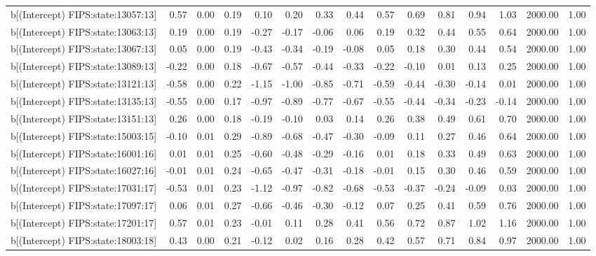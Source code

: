 \begin{table}[ht]
\begin{tabular}{rrrrrrrrrrrrrrr}
  b[(Intercept) FIPS:state:13057:13] & 0.57 & 0.00 & 0.19 & 0.10 & 0.20 & 0.33 & 0.44 & 0.57 & 0.69 & 0.81 & 0.94 & 1.03 & 2000.00 & 1.00 \\ 
  b[(Intercept) FIPS:state:13063:13] & 0.19 & 0.00 & 0.19 & -0.27 & -0.17 & -0.06 & 0.06 & 0.19 & 0.32 & 0.44 & 0.55 & 0.64 & 2000.00 & 1.00 \\ 
  b[(Intercept) FIPS:state:13067:13] & 0.05 & 0.00 & 0.19 & -0.43 & -0.34 & -0.19 & -0.08 & 0.05 & 0.18 & 0.30 & 0.44 & 0.54 & 2000.00 & 1.00 \\ 
  b[(Intercept) FIPS:state:13089:13] & -0.22 & 0.00 & 0.18 & -0.67 & -0.57 & -0.44 & -0.33 & -0.22 & -0.10 & 0.01 & 0.13 & 0.25 & 2000.00 & 1.00 \\ 
  b[(Intercept) FIPS:state:13121:13] & -0.58 & 0.00 & 0.22 & -1.15 & -1.00 & -0.85 & -0.71 & -0.59 & -0.44 & -0.30 & -0.14 & 0.01 & 2000.00 & 1.00 \\ 
  b[(Intercept) FIPS:state:13135:13] & -0.55 & 0.00 & 0.17 & -0.97 & -0.89 & -0.77 & -0.67 & -0.55 & -0.44 & -0.34 & -0.23 & -0.14 & 2000.00 & 1.00 \\ 
  b[(Intercept) FIPS:state:13151:13] & 0.26 & 0.00 & 0.18 & -0.19 & -0.10 & 0.03 & 0.14 & 0.26 & 0.38 & 0.49 & 0.61 & 0.70 & 2000.00 & 1.00 \\ 
  b[(Intercept) FIPS:state:15003:15] & -0.10 & 0.01 & 0.29 & -0.89 & -0.68 & -0.47 & -0.30 & -0.09 & 0.11 & 0.27 & 0.46 & 0.64 & 2000.00 & 1.00 \\ 
  b[(Intercept) FIPS:state:16001:16] & 0.01 & 0.01 & 0.25 & -0.60 & -0.48 & -0.29 & -0.16 & 0.01 & 0.18 & 0.33 & 0.49 & 0.63 & 2000.00 & 1.00 \\ 
  b[(Intercept) FIPS:state:16027:16] & -0.01 & 0.01 & 0.24 & -0.65 & -0.47 & -0.31 & -0.18 & -0.01 & 0.15 & 0.30 & 0.46 & 0.59 & 2000.00 & 1.00 \\ 
  b[(Intercept) FIPS:state:17031:17] & -0.53 & 0.01 & 0.23 & -1.12 & -0.97 & -0.82 & -0.68 & -0.53 & -0.37 & -0.24 & -0.09 & 0.03 & 2000.00 & 1.00 \\ 
  b[(Intercept) FIPS:state:17097:17] & 0.06 & 0.01 & 0.27 & -0.66 & -0.46 & -0.30 & -0.12 & 0.07 & 0.25 & 0.41 & 0.59 & 0.76 & 2000.00 & 1.00 \\ 
  b[(Intercept) FIPS:state:17201:17] & 0.57 & 0.01 & 0.23 & -0.01 & 0.11 & 0.28 & 0.41 & 0.56 & 0.72 & 0.87 & 1.02 & 1.16 & 2000.00 & 1.00 \\ 
  b[(Intercept) FIPS:state:18003:18] & 0.43 & 0.00 & 0.21 & -0.12 & 0.02 & 0.16 & 0.28 & 0.42 & 0.57 & 0.71 & 0.84 & 0.97 & 2000.00 & 1.00 \\ 

\end{tabular}
\end{table}
